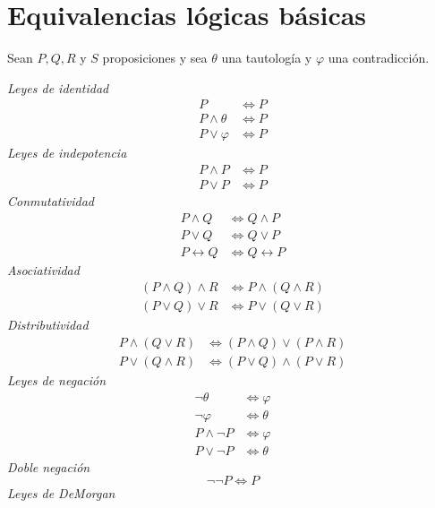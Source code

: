 \section{Equivalencias lógicas básicas}

Sean \(P,Q,R\) y \(S\) proposiciones y sea \(\theta\) una tautología y \(\varphi\) una contradicción.
\begin{multicols}{2}
  \emph{Leyes de identidad}
  \[
    \begin{aligned}
      P &\Leftrightarrow P \\
      P\land\theta &\Leftrightarrow P \\
      P\lor\varphi &\Leftrightarrow P
    \end{aligned}
  \]
  \emph{Leyes de indepotencia}
  \[
    \begin{aligned}
      P\land P &\Leftrightarrow P \\
      P\lor P &\Leftrightarrow P
    \end{aligned}
  \]
  \emph{Conmutatividad}
  \[
    \begin{aligned}
      P\land Q &\Leftrightarrow Q\land P \\
      P\lor Q &\Leftrightarrow Q\lor P \\
      P\leftrightarrow Q &\Leftrightarrow Q\leftrightarrow P
    \end{aligned}
  \]
  \emph{Asociatividad}
  \[
    \begin{aligned}
      (P\land Q)\land R &\Leftrightarrow P\land(Q\land R) \\
      (P\lor Q)\lor R &\Leftrightarrow P\lor(Q\lor R)
    \end{aligned}
  \]
  \emph{Distributividad}
  \[
    \begin{aligned}
      P\land(Q\lor R) &\Leftrightarrow (P\land Q)\lor(P\land R) \\
      P\lor(Q\land R) &\Leftrightarrow (P\lor Q)\land(P\lor R)
    \end{aligned}
  \]
  \emph{Leyes de negación}
  \[
    \begin{aligned}
      \neg\theta &\Leftrightarrow \varphi \\
      \neg\varphi &\Leftrightarrow \theta \\
      P\land\neg P &\Leftrightarrow \varphi \\
      P\lor\neg P &\Leftrightarrow \theta
    \end{aligned}
  \]
  \emph{Doble negación}
  \[
    \neg\neg P \Leftrightarrow P
  \]
  \emph{Leyes de DeMorgan}
  \[
    \begin{aligned}

\end{aligned}\]
\end{multicols}
